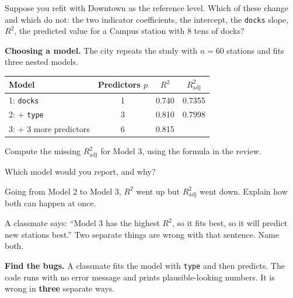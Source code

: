 \documentclass[11pt]{article}
\newcommand{\blankline}[1]{\underline{\hspace{#1}}}
\newcommand{\answerspace}[1]{\vspace{#1}}
\begin{document}
\begin{questions}
\begin{parts}
\item Suppose you refit with Downtown as the reference level. Which of these change and which do
not: the two indicator coefficients, the intercept, the \texttt{docks} slope, $R^2$, the predicted
value for a Campus station with 8 tens of docks?
\answerspace{4.5em}
\end{parts}

\item \textbf{Choosing a model.} The city repeats the study with $n = 60$ stations and fits three
nested models.

\begin{center}
\renewcommand{\arraystretch}{1.5}
\begin{tabular}{lccc}
\toprule
\textbf{Model} & \textbf{Predictors $p$} & \textbf{$R^2$} & \textbf{$R^2_{\text{adj}}$} \\
\midrule
1: \texttt{docks} & 1 & 0.740 & 0.7355 \\
2: $+$ \texttt{type} & 3 & 0.810 & 0.7998 \\
3: $+$ 3 more predictors & 6 & 0.815 & \blankline{1in} \\
\bottomrule
\end{tabular}
\end{center}

\begin{parts}
\item Compute the missing $R^2_{\text{adj}}$ for Model 3, using the formula in the review.
\answerspace{4em}

\item Which model would you report, and why?
\answerspace{3.5em}

\item Going from Model 2 to Model 3, $R^2$ went up but $R^2_{\text{adj}}$ went down. Explain how
both can happen at once.
\answerspace{4em}

\item A classmate says: ``Model 3 has the highest $R^2$, so it fits best, so it will predict new
stations best.'' Two separate things are wrong with that sentence. Name both.
\answerspace{4.5em}
\end{parts}

\item \textbf{Find the bugs.} A classmate fits the model with \texttt{type} and then predicts. The
code runs with no error message and prints plausible-looking numbers. It is wrong in
\textbf{three} separate ways.


\end{questions}
\end{document}
